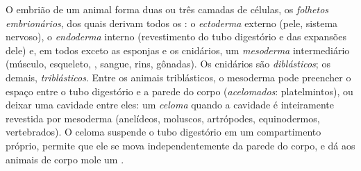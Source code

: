 \begin{definition}\label{def:b1:body-plans-tissues:layers}
O embrião de um animal forma duas ou três camadas de células, os
\emph{folhetos embrionários}, dos quais
derivam todos os : o \emph{ectoderma} externo
(pele, sistema nervoso), o \emph{endoderma} interno
(revestimento do tubo digestório e das expansões dele) e, em todos
exceto as esponjas e os cnidários, um \emph{mesoderma}
intermediário (músculo, esqueleto, , sangue, rins,
gônadas). Os cnidários são \emph{diblásticos}; os demais,
\emph{triblásticos}. Entre os animais triblásticos, o mesoderma pode
preencher o espaço entre o tubo digestório e a parede do corpo
(\emph{acelomados}: platelmintos), ou deixar uma cavidade entre eles: um
\emph{celoma} quando a cavidade é inteiramente revestida
por mesoderma (anelídeos, moluscos, artrópodes, equinodermos,
vertebrados). O celoma suspende o tubo digestório em um compartimento
próprio, permite que ele se mova independentemente da parede do corpo, e
dá aos animais de corpo mole um .
\end{definition}

